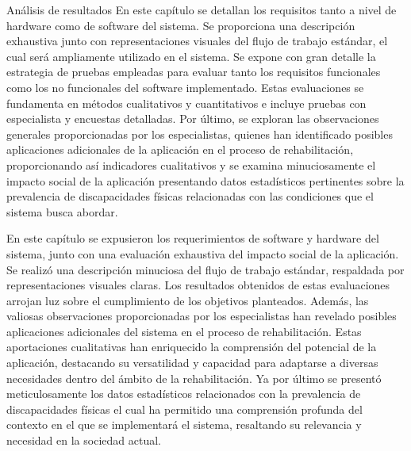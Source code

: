 \begin{thesischapter}{3} {Análisis de resultados}
En este capítulo se detallan los requisitos tanto a nivel de hardware como de software del sistema. Se proporciona una descripción exhaustiva junto con representaciones visuales del flujo de trabajo estándar, el cual será ampliamente utilizado en el sistema. Se expone con gran detalle la estrategia de pruebas empleadas para evaluar tanto los requisitos funcionales como los no funcionales del software implementado. Estas evaluaciones se fundamenta en métodos cualitativos y cuantitativos e incluye pruebas con especialista y encuestas detalladas. Por último, se exploran las observaciones generales proporcionadas por los especialistas, quienes han identificado posibles aplicaciones adicionales de la aplicación en el proceso de rehabilitación, proporcionando así indicadores cualitativos y se examina minuciosamente el impacto social de la aplicación presentando datos estadísticos pertinentes sobre la prevalencia de discapacidades físicas relacionadas con las condiciones que el sistema busca abordar.









En este capítulo se expusieron los requerimientos de software y hardware del sistema, junto con una evaluación exhaustiva del impacto social de la aplicación. Se realizó una descripción minuciosa del flujo de trabajo estándar, respaldada por representaciones visuales claras. Los resultados obtenidos de estas evaluaciones arrojan luz sobre el cumplimiento de los objetivos planteados. Además, las valiosas observaciones proporcionadas por los especialistas han revelado posibles aplicaciones adicionales del sistema en el proceso de rehabilitación. Estas aportaciones cualitativas han enriquecido la comprensión del potencial de la aplicación, destacando su versatilidad y capacidad para adaptarse a diversas necesidades dentro del ámbito de la rehabilitación. Ya por último se presentó meticulosamente los datos estadísticos relacionados con la prevalencia de discapacidades físicas el cual ha permitido una comprensión profunda del contexto en el que se implementará el sistema, resaltando su relevancia y necesidad en la sociedad actual.

\end{thesischapter}
